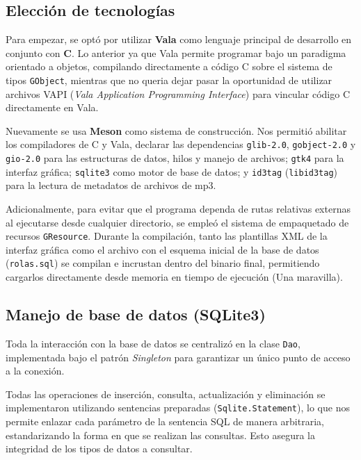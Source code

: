 \documentclass{rep}
\begin{document}
    \subsection{Elección de tecnologías}

    Para empezar, se optó por utilizar \textbf{Vala} como lenguaje
    principal de desarrollo en conjunto con \textbf{C}. Lo anterior ya
    que Vala permite programar bajo un paradigma orientado a objetos,
    compilando directamente a código C sobre el sistema de tipos
    \texttt{GObject}, mientras que no queria dejar pasar la
    oportunidad de utilizar archivos VAPI (\textit{Vala Application
      Programming Interface}) para vincular código C directamente en
    Vala.
    
    Nuevamente se usa \textbf{Meson} como sistema de construcción.
    Nos permitió abilitar los compiladores de C y Vala, declarar las
    dependencias \texttt{glib-2.0}, \texttt{gobject-2.0} y
    \texttt{gio-2.0} para las estructuras de datos, hilos y manejo de
    archivos; \texttt{gtk4} para la interfaz gráfica; \texttt{sqlite3}
    como motor de base de datos; y \texttt{id3tag}
    (\texttt{libid3tag}) para la lectura de metadatos de archivos de
    mp3.

    Adicionalmente, para evitar que el programa dependa de rutas
    relativas externas al ejecutarse desde cualquier directorio, se
    empleó el sistema de empaquetado de recursos
    \texttt{GResource}. Durante la compilación, tanto las plantillas
    XML de la interfaz gráfica como el archivo con el esquema inicial
    de la base de datos (\texttt{rolas.sql}) se compilan e incrustan
    dentro del binario final, permitiendo cargarlos directamente desde
    memoria en tiempo de ejecución (Una maravilla).

    \subsection{Manejo de base de datos (SQLite3)}

    Toda la interacción con la base de datos se centralizó en la clase
    \texttt{Dao}, implementada bajo el patrón \textit{Singleton} para
    garantizar un único punto de acceso a la conexión.
    
    Todas las operaciones de inserción, consulta, actualización y
    eliminación se implementaron utilizando sentencias preparadas
    (\texttt{Sqlite.Statement}), lo que nos permite enlazar cada
    parámetro de la sentencia SQL de manera arbitraria, estandarizando
    la forma en que se realizan las consultas. Esto asegura la
    integridad de los tipos de datos a consultar.
\end{document}

